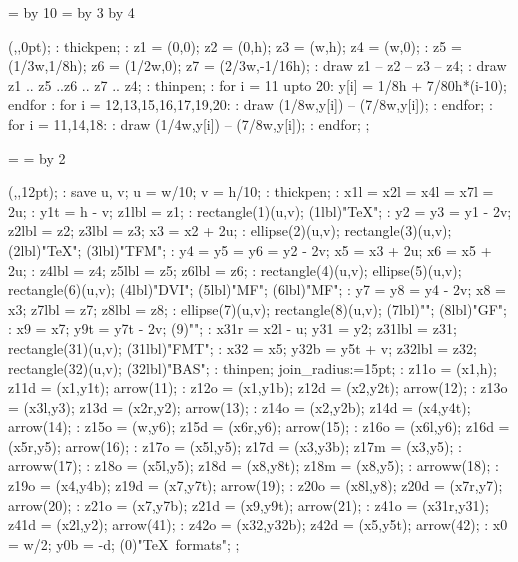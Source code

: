 
=\hsize \divide{} by 10
= \divide{} by 3 \multiply{} by 4

\MTbeginchar(\the{},\the{},0pt);
\MT: thickpen;
\MT: z1 = (0,0); z2 = (0,h); z3 = (w,h); z4 = (w,0);
\MT: z5 = (1/3w,1/8h); z6 = (1/2w,0); z7 = (2/3w,-1/16h);
\MT: draw z1 -- z2 -- z3 -- z4;
\MT: draw z1 .. z5 ..z6 .. z7 .. z4;
\MT: thinpen;
\MT: for i = 11 upto 20: y[i] = 1/8h + 7/80h*(i-10); endfor
\MT: for i = 12,13,15,16,17,19,20:
\MT:  draw (1/8w,y[i]) -- (7/8w,y[i]);
\MT: endfor;
\MT: for i = 11,14,18:
\MT:  draw (1/4w,y[i]) -- (7/8w,y[i]);
\MT: endfor;
\MTendchar;

=\box\MTbox
{}=\hsize %
\divide{} by 2

\ifdim\hsize<10cm \let\figfont=\smallsf \def\driver{drv}
 \else \let\figfont=\sf \def\driver{Driver}\fi

\MTbeginchar(\the\hsize,\the{},12pt);
\MT: save u, v; u = w/10; v = h/10;
\MT: thickpen;
\MT: x1l = x2l = x4l = x7l = 2u;
\MT: y1t = h - v; z1lbl = z1;
\MT: rectangle(1)(u,v);
\MTlabel(1lbl)"\figfont\TeX";
\MT: y2 = y3 = y1 - 2v; z2lbl = z2; z3lbl = z3; x3 = x2 + 2u;
\MT: ellipse(2)(u,v); rectangle(3)(u,v);
\MTlabel(2lbl)"\figfont\TeX"; \MTlabel(3lbl)"\figfont TFM";
\MT: y4 = y5 = y6 = y2 - 2v; x5 = x3 + 2u; x6 = x5 + 2u;
\MT: z4lbl = z4; z5lbl = z5; z6lbl = z6;
\MT: rectangle(4)(u,v); ellipse(5)(u,v); rectangle(6)(u,v);
\MTlabel(4lbl)"\figfont DVI"; \MTlabel(5lbl)"\figfont MF";
\MTlabel(6lbl)"\figfont MF";
\MT: y7 = y8 = y4 - 2v; x8 = x3; z7lbl = z7; z8lbl = z8;
\MT: ellipse(7)(u,v); rectangle(8)(u,v);
\MTlabel(7lbl)"\figfont\driver"; \MTlabel(8lbl)"\figfont GF";
\MT: x9 = x7; y9t = y7t - 2v;
\MTlabel(9)"";
\MT: x31r = x2l - u; y31 = y2; z31lbl = z31; rectangle(31)(u,v);
\MTlabel(31lbl)"\figfont FMT";
\MT: x32 = x5; y32b = y5t + v; z32lbl = z32; rectangle(32)(u,v);
\MTlabel(32lbl)"\figfont BAS";
\MT: thinpen; join_radius:=15pt;
\MT: z11o = (x1,h); z11d = (x1,y1t); arrow(11);
\MT: z12o = (x1,y1b); z12d = (x2,y2t); arrow(12);
\MT: z13o = (x3l,y3); z13d = (x2r,y2); arrow(13);
\MT: z14o = (x2,y2b); z14d = (x4,y4t); arrow(14);
\MT: z15o = (w,y6); z15d = (x6r,y6); arrow(15);
\MT: z16o = (x6l,y6); z16d = (x5r,y5); arrow(16);
\MT: z17o = (x5l,y5); z17d = (x3,y3b); z17m = (x3,y5);
\MT: arroww(17);
\MT: z18o = (x5l,y5); z18d = (x8,y8t); z18m = (x8,y5);
\MT: arroww(18);
\MT: z19o = (x4,y4b); z19d = (x7,y7t); arrow(19);
\MT: z20o = (x8l,y8); z20d = (x7r,y7); arrow(20);
\MT: z21o = (x7,y7b); z21d = (x9,y9t); arrow(21);
\MT: z41o = (x31r,y31); z41d = (x2l,y2); arrow(41);
\MT: z42o = (x32,y32b); z42d = (x5,y5t); arrow(42);
\MT: x0 = w/2; y0b = -d;
\MTlabel(0)"\rm \TeX\ formats";
\MTendchar;

\centerline{\box\MTbox}
